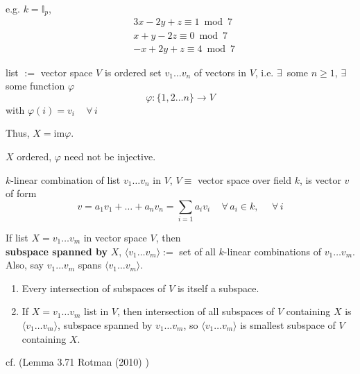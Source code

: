 e.g. $k = \mathbb{I}_p$, 
\[
\begin{aligned}
& 3x - 2y + z \equiv 1 \bmod{7} \\
& x + y -2 z \equiv 0 \bmod{7} \\
& -x + 2y + z \equiv 4 \bmod{7}
\end{aligned}
\]
\begin{definition}[list]
	list $:=$ vector space $V$ is ordered set $v_1 \dots v_n$ of vectors in $V$, i.e. 
	$\exists \, $ some $n\geq 1$, $\exists \, $ some function $\varphi$ 
	\[
	\varphi : \lbrace 1,2\dots n \rbrace \to V
	\]
	with $\varphi(i) = v_i \quad \, \forall \, i$
\end{definition}

Thus, $X = \text{im}\varphi$.

$X$ ordered, $\varphi$ need not be injective. 

\begin{definition}
	$k$-linear combination of list $v_1\dots v_n$ in $V$, $V\equiv $ vector space over field $k$, is vector $v$ of form 
	\[
	v = a_1 v_1 + \dots + a_n v_n  = \sum_{i=1} a_i v_i \quad \, \forall \, a_i \in k, \, \quad \, \forall \, i
	\]
\end{definition}

\begin{definition}[list]
	If list $X = v_1 \dots v_m$ in vector space $V$, then \\
	\textbf{subspace spanned by } $X$, $\langle v_1 \dots v_m \rangle := $ set of all $k$-linear combinations of $v_1 \dots v_m$.  Also, say $v_1 \dots v_m $ spans $\langle v_1 \dots v_m\rangle$. 
\end{definition}

\begin{lemma}\label{agat:Lemma:smallest_subspace}
\begin{enumerate}
	\item[(i)] Every intersection of subspaces of $V$ is itself a subspace.
	\item[(ii)] If $X= v_1 \dots v_m$ list in $V$, then intersection of all subspaces of $V$ containing $X$ is $\langle v_1 \dots v_m \rangle$, subspace spanned by $v_1\dots v_m$, so $\langle v_1 \dots v_m \rangle$ is smallest subspace of $V$ containing $X$. 
\end{enumerate}
\end{lemma}
cf. (Lemma 3.71 Rotman (2010) \cite{agat:JRotman2010}) 

